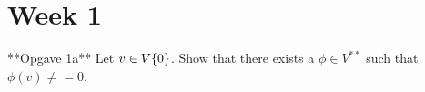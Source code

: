 \section{Week 1}

**Opgave 1a** Let $v \in V\\ \{0\}$. Show that there exists a $\phi \in V^{**}$ such that $\phi(v) \neq =0$. 
